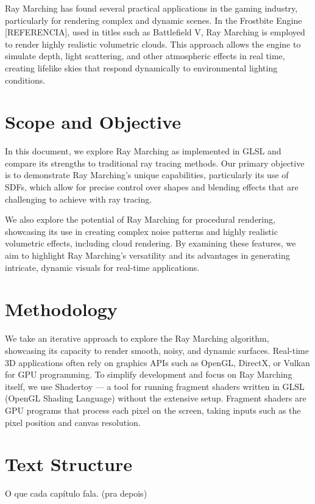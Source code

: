 Ray Marching has found several practical applications in the gaming industry, particularly for rendering complex and dynamic scenes. In the Frostbite Engine [REFERENCIA], used in titles such as Battlefield V, Ray Marching is employed to render highly realistic volumetric clouds. This approach allows the engine to simulate depth, light scattering, and other atmospheric effects in real time, creating lifelike skies that respond dynamically to environmental lighting conditions. 


\section{Scope and Objective}

In this document, we explore Ray Marching as implemented in GLSL and compare its strengths to traditional ray tracing methods. Our primary objective is to demonstrate Ray Marching's unique capabilities, particularly its use of SDFs, which allow for precise control over shapes and blending effects that are challenging to achieve with ray tracing.


We also explore the potential of Ray Marching for procedural rendering, showcasing its use in creating complex noise patterns and highly realistic volumetric effects, including cloud rendering. By examining these features, we aim to highlight Ray Marching’s versatility and its advantages in generating intricate, dynamic visuals for real-time applications.

\section{Methodology}

We take an iterative approach to explore the Ray Marching algorithm, showcasing its capacity to render smooth, noisy, and dynamic surfaces. Real-time 3D applications often rely on graphics APIs such as OpenGL, DirectX, or Vulkan for GPU programming. To simplify development and focus on Ray Marching itself, we use Shadertoy — a tool for running fragment shaders written in GLSL (OpenGL Shading Language) without the extensive setup. Fragment shaders are GPU programs that process each pixel on the screen, taking inputs such as the pixel position and canvas resolution.

\section{Text Structure}

O que cada capítulo fala. (pra depois)